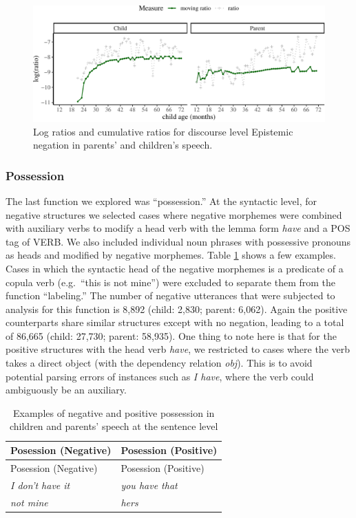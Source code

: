 \documentclass[
  english,
  man,floatsintext]{apa6}
\begin{document}
\begin{figure}[H]

{\centering \includegraphics{neg_construction_article_files/figure-latex/epistemicdiscourse-1} 

}

\caption{Log ratios and cumulative ratios for discourse level Epistemic negation in parents' and children's speech.}\label{fig:epistemicdiscourse}
\end{figure}

\hypertarget{possession}{%
\subsubsection{Possession}\label{possession}}

The last function we explored was ``possession.'' At the syntactic level, for negative structures we selected cases where negative morphemes were combined with auxiliary verbs to modify a head verb with the lemma form \emph{have} and a POS tag of VERB. We also included individual noun phrases with possessive pronouns as heads and modified by negative morphemes. Table \ref{tab:possess} shows a few examples. Cases in which the syntactic head of the negative morphemes is a predicate of a copula verb (e.g.~``this is not mine'') were excluded to separate them from the function ``labeling.'' The number of negative utterances that were subjected to analysis for this function is 8,892 (child: 2,830; parent: 6,062). Again the positive counterparts share similar structures except with no negation, leading to a total of 86,665 (child: 27,730; parent: 58,935). One thing to note here is that for the positive structures with the head verb \emph{have}, we restricted to cases where the verb takes a direct object (with the dependency relation \emph{obj}). This is to avoid potential parsing errors of instances such as \emph{I have}, where the verb could ambiguously be an auxiliary.

\begin{longtable}[]{@{}ll@{}}
\caption{\label{tab:possess} Examples of negative and positive possession in children and parents' speech at the sentence level}\tabularnewline
\toprule
Posession (Negative) & Posession (Positive) \\
\midrule
\endfirsthead
\toprule
Posession (Negative) & Posession (Positive) \\
\midrule
\endhead
\emph{I don't have it} & \emph{you have that} \\
\emph{not mine} & \emph{hers} \\
\bottomrule
\end{longtable}
\end{document}
